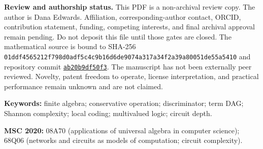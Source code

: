 \documentclass[
  11pt,
]{article}
\theoremstyle{definition}
\theoremstyle{remark}
\begin{document}
\begin{abstract}
\(D_r(f) \ge  r-\log_3(\log r)-O(1)\),

and therefore the worst-case interval

\(r-\log_3(\log r)-O(1) \le  \Delta_r(Q) \le  r+O(\log r)\).

The displayed upper bound is a manuscript theorem with an explicit
generic proof and a separate no-author-import executable reconstruction.
It remains unformalized as an integrated Lean DAG theorem and does not
settle the optimal additive term. The independently audited
growing-router schedule supplied the earlier \(r+O(\sqrt{r})\) stage
after a required residual-first repair. Historical R6/R7 and R9 bounds
remain visible as prior compiler stages. The construction combines an
exact conservative-clone census, dynamic value names, classical local
coding, recursive subcube libraries, a balanced absorbing anchor, signed
discriminator routers, and parallel address programs. Deterministic
experiments check finite semantics, compiler schedules, mutations, and
structural arithmetic. They are validation evidence, not substitutes for
the generic proofs. No publication novelty, legal conclusion, practical
performance, or relationship to private Tau work is claimed.
\end{abstract}

{
\hypersetup{linkcolor=}
\setcounter{tocdepth}{2}
\tableofcontents
}
\begin{reviewnotice}
\textbf{Review and authorship status.} This PDF is a non-archival review copy.
The author is Dana Edwards. Affiliation, corresponding-author contact, ORCID,
contribution statement, funding, competing interests, and final archival
approval remain pending. Do not deposit this file until those gates are closed.
The mathematical source is bound to
SHA-256 \texttt{01ddf4565212f798d0adf5c4c9b16d6de9074a317a34f2a39a80051de55a5410} and repository commit
\href{https://github.com/TheDarkLightX/OrbitSynthesis/commit/ab20b9df50f331e430c1a43a9d8c3af9c1e8556c}
{\texttt{ab20b9df50f3}}. The manuscript has not been externally peer
reviewed. Novelty, patent freedom to operate, license interpretation, and
practical performance remain unknown and are not claimed.
\end{reviewnotice}

\noindent\textbf{Keywords:} finite algebra; conservative operation;
discriminator; term DAG; Shannon complexity; local coding; multivalued
logic; circuit depth.

\noindent\textbf{MSC 2020:} 08A70 (applications of universal algebra in
computer science); 68Q06 (networks and circuits as models of
computation; circuit complexity).
\end{document}
